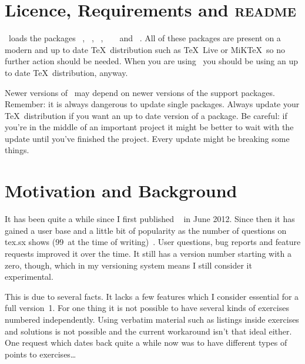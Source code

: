 \documentclass{xsim-manual}
\begin{document}
\section{Licence, Requirements and \textsc{readme}}
\license

\xsim\ loads the packages ~\cite{bnd:l3kernel},
~\cite{bnd:l3packages}, ~\cite{pkg:etoolbox},
~\cite{pkg:array} ~\cite{pkg:booktabs} and
~\cite{pkg:translations}.  All of these packages are present
on a modern and up to date \TeX\ distribution such as \TeX~Live or MiK\TeX\ so
no further action should be needed.  When you are using \xsim\ you should be
using an up to date \TeX\ distribution, anyway.

\begin{bewareofthedog}
  Newer versions of \xsim\ may depend on newer versions of the support
  packages.  Remember: it is always dangerous to update single packages.
  Always update your \TeX\ distribution if you want an up to date version of a
  package.  Be careful: if you're in the middle of an important project it
  might be better to wait with the update until you've finished the project.
  Every update might be breaking some things.
\end{bewareofthedog}


\section{Motivation and Background}

It has been quite a while since I first published
~\cite{pkg:exsheets} in June 2012.  Since then it has gained a
user base and a little bit of popularity as the number of questions on tex.sx
shows (99~at the time of writing)~\cite{texsx:tagged/exsheets}.  User
questions, bug reports and feature requests improved it over the time.  It
still has a version number starting with a zero, though, which in my
versioning system means I still consider it experimental.

This is due to several facts.  It lacks a few features which I consider
essential for a full version~1.  For one thing it is not possible to have
several kinds of exercises numbered independently.  Using verbatim material
such as listings inside exercises and solutions is not possible and the
current workaround isn't that ideal either.  One request which dates back
quite a while now was to have different types of points to exercises\ldots
\end{document}
